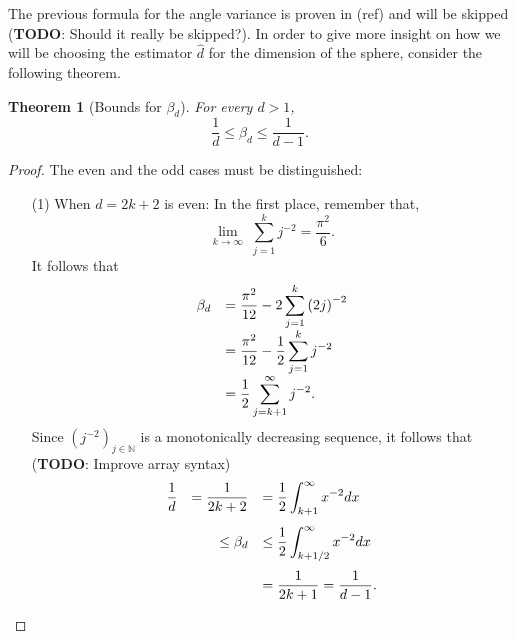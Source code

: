 \documentclass[12pt]{exam}
\def\N{\ensuremath{\mathbb{N}}}
\newtheorem{theorem}{Theorem}[section]
\theoremstyle{remark}
\begin{document}
The previous formula for the angle variance is proven in (ref) and will be skipped (\textbf{TODO}: Should it really be skipped?). In order to give more insight on how we will be choosing the estimator $\widehat{d}$ for the dimension of the sphere, consider the following theorem.

\begin{theorem}[Bounds for $\beta_d$]\label{ade:T1}
  For every $d > 1$,
  \[ \frac{1}{d} \leq \beta_d \leq \frac{1}{d-1}. \] 
\end{theorem}

\begin{proof}
  The even and the odd cases must be distinguished:
  \begin{enumerate}
    \item[(1)] When $d = 2k+2$ is even:
    In the first place, remember that,
    \[ \lim_{k\to\infty}\; \sum_{j = 1}^{k} j^{-2} = \frac{\pi^2}{6}.\] 
    It follows that
    \[\everymath{\displaystyle}
      \begin{array}{rl}
        \beta_d & = \frac{\pi^2}{12} - 2 \sum_{j = 1}^{k} {(2j)}^{-2}\\
        & = \frac{\pi^2}{12} - \frac{1}{2} \sum_{j = 1}^{k} j^{-2}\\
        & = \frac{1}{2} \sum_{j = k+1}^{\infty} j^{-2}.
      \end{array}      
     \]
    Since ${(j^{-2})}_{j \in \N}$ is a monotonically decreasing sequence, it follows that (\textbf{TODO}: Improve array syntax)
    \[\everymath{\displaystyle} 
      \begin{array}{rrl}
        \frac{1}{d}   & = \frac{1}{2k+2}  & = \frac{1}{2} \int_{k+1}^{\infty}x^{-2} dx\\[5mm]
      & \leq \beta_d  & \leq  \frac{1}{2} \int_{k+1/2}^{\infty}x^{-2} dx\\[5mm]
      & & = \frac{1}{2k+1} = \frac{1}{d-1}.
    \end{array}  \] 


\end{enumerate}
\end{proof}
\end{document}
